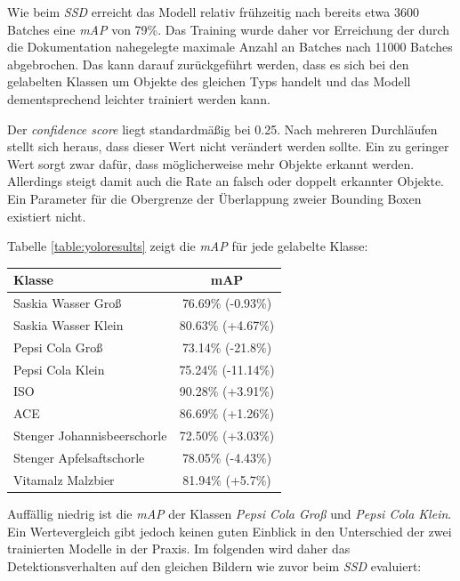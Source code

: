 Wie beim \textit{SSD} erreicht das Modell relativ frühzeitig nach bereits etwa 3600 Batches eine \textit{mAP} von 79\%. Das Training wurde daher vor Erreichung der durch die Dokumentation nahegelegte maximale Anzahl an Batches nach 11000 Batches abgebrochen. Das kann darauf zurückgeführt werden, dass es sich bei den gelabelten Klassen um Objekte des gleichen Typs handelt und das Modell dementsprechend leichter trainiert werden kann. 

Der \textit{confidence score} liegt standardmäßig bei 0.25. Nach mehreren Durchläufen stellt sich heraus, dass dieser Wert nicht verändert werden sollte. Ein zu geringer Wert sorgt zwar dafür, dass möglicherweise mehr Objekte erkannt werden. Allerdings steigt damit auch die Rate an falsch oder doppelt erkannter Objekte. Ein Parameter für die Obergrenze der Überlappung zweier Bounding Boxen existiert nicht.

Tabelle \ref{table:yoloresults} zeigt die \textit{mAP} für jede gelabelte Klasse:

\begin{center}
	\begin{tabular}[H]{l|c}
		Klasse & mAP \\
		\hline
		Saskia Wasser Groß & 76.69\% (-0.93\%)\\
		Saskia Wasser Klein & 80.63\% (+4.67\%)\\
		Pepsi Cola Groß & 73.14\% (-21.8\%)\\
		Pepsi Cola Klein & 75.24\% (-11.14\%)\\
		ISO & 90.28\% (+3.91\%)\\
		ACE & 86.69\% (+1.26\%)\\
		Stenger Johannisbeerschorle & 72.50\% (+3.03\%)\\
		Stenger Apfelsaftschorle & 78.05\% (-4.43\%)\\
		Vitamalz Malzbier & 81.94\% (+5.7\%)
	\end{tabular}
	\label{table:yoloresults}
\end{center}

Auffällig niedrig ist die \textit{mAP} der Klassen \textit{Pepsi Cola Groß} und \textit{Pepsi Cola Klein}. Ein Wertevergleich gibt jedoch keinen guten Einblick in den Unterschied der zwei trainierten Modelle in der Praxis. Im folgenden wird daher das Detektionsverhalten auf den gleichen Bildern wie zuvor beim \textit{SSD} evaluiert:

